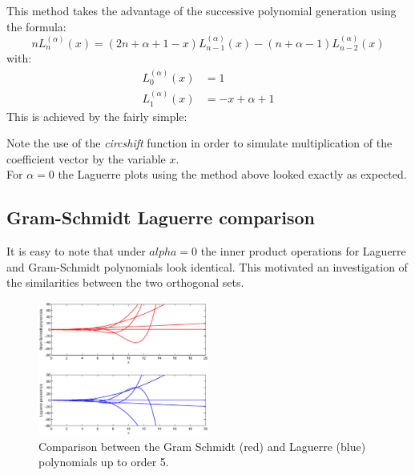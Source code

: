 \documentclass[a4paper]{article}
\numberwithin{equation}{section}
\begin{document}
This method takes the advantage of the successive polynomial generation using the formula:
\begin{equation}
n L_n^{(\alpha)}(x) = (2n + \alpha + 1 - x) L_{n-1}^{(\alpha)}(x) - (n + \alpha - 1) L_{n-2}^{(\alpha)}(x)
\end{equation}
with:
\begin{align}
L_0^{(\alpha)}(x) &= 1 \\
L_1^{(\alpha)}(x) &= -x+\alpha+1
\end{align}
This is achieved by the fairly simple:


\noindent Note the use of the \textit{circshift} function in order to simulate multiplication of the coefficient vector by the variable $x$.\\
For $\alpha = 0$ the Laguerre plots using the method above looked exactly as expected.

\subsection{Gram-Schmidt Laguerre comparison}

It is easy to note that under $alpha = 0$ the inner product operations for Laguerre and Gram-Schmidt polynomials look identical. This motivated an investigation of the similarities between the two orthogonal sets.

\begin{figure}[!h]
\centering
\includegraphics[width=0.5\textwidth]{gs_laguerre_comparison.eps}
\caption{\label{fig:gslaguerrecomparison}Comparison between the Gram Schmidt (red) and Laguerre (blue) polynomials up to order 5.}
\end{figure}
\end{document}
